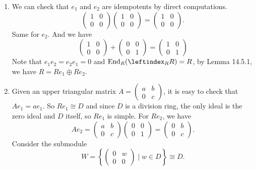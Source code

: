 \documentclass[a4paper, 12pt]{article}
\begin{document}
\begin{solution}
\begin{enumerate}[(1)]
\item We can check that \(e_1\) and \(e_2\) are idempotents by direct computations.
\[\begin{pmatrix}
    1&0\\ 
    0&0
\end{pmatrix}\begin{pmatrix}
    1&0\\ 
    0&0
\end{pmatrix}=\begin{pmatrix}
    1&0\\ 
    0&0
\end{pmatrix}.\]
Same for \(e_2\). And we have 
\[\begin{pmatrix}
    1&0\\ 
    0&0
\end{pmatrix}+\begin{pmatrix}
    0&0\\ 
    0&1
\end{pmatrix}=\begin{pmatrix}
    1&0\\ 
    0&1
\end{pmatrix}\]
Note that \(e_1e_2=e_2e_1=0\) and \(\text{End}_R(\leftindex_R R)=R\), by Lemma 14.5.1, we have \(R=Re_1\oplus Re_2\).
\item Given an upper triangular matrix \(A=\begin{pmatrix}
    a&b\\ 
    0&c
\end{pmatrix}\), it is easy to check that \(Ae_1=ae_1\). So \(Re_1\cong D\) and since \(D\) is a division ring, the only ideal is the zero ideal and \(D\) itself, so \(Re_1\) is simple. 
For \(Re_2\), we have 
\[Ae_2=\begin{pmatrix}
    a&b\\ 
    0&c
\end{pmatrix}\begin{pmatrix}
    0&0\\ 
    0&1
\end{pmatrix}=\begin{pmatrix}
    0&b\\ 
    0&c
\end{pmatrix}.\]
Consider the submodule 
\[W=\left\{ \begin{pmatrix}
0&w\\ 
0&0
\end{pmatrix}\mid w\in D \right\}\cong D.\]

\end{enumerate}
\end{solution}
\end{document}
